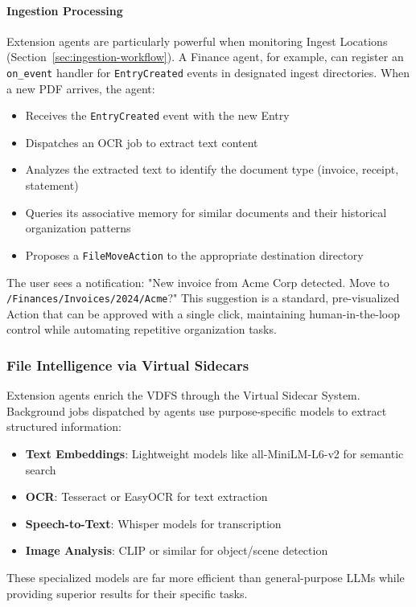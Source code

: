 \documentclass[sigconf]{acmart}
\begin{document}
\paragraph{Ingestion Processing}
\label{sec:ai-native-ingestion}
Extension agents are particularly powerful when monitoring Ingest Locations (Section~\ref{sec:ingestion-workflow}). A Finance agent, for example, can register an \texttt{on\_event} handler for \texttt{EntryCreated} events in designated ingest directories. When a new PDF arrives, the agent:
\begin{itemize}[noitemsep, topsep=0pt]
    \item Receives the \texttt{EntryCreated} event with the new Entry
    \item Dispatches an OCR job to extract text content
    \item Analyzes the extracted text to identify the document type (invoice, receipt, statement)
    \item Queries its associative memory for similar documents and their historical organization patterns
    \item Proposes a \texttt{FileMoveAction} to the appropriate destination directory
\end{itemize}
The user sees a notification: "New invoice from Acme Corp detected. Move to \texttt{/Finances/Invoices/2024/Acme}?" This suggestion is a standard, pre-visualized Action that can be approved with a single click, maintaining human-in-the-loop control while automating repetitive organization tasks.

\subsubsection{File Intelligence via Virtual Sidecars}
Extension agents enrich the VDFS through the Virtual Sidecar System. Background jobs dispatched by agents use purpose-specific models to extract structured information:
\begin{itemize}
    \item \textbf{Text Embeddings}: Lightweight models like all-MiniLM-L6-v2 for semantic search
    \item \textbf{OCR}: Tesseract or EasyOCR for text extraction
    \item \textbf{Speech-to-Text}: Whisper models for transcription
    \item \textbf{Image Analysis}: CLIP or similar for object/scene detection
\end{itemize}
These specialized models are far more efficient than general-purpose LLMs while providing superior results for their specific tasks.
\end{document}
